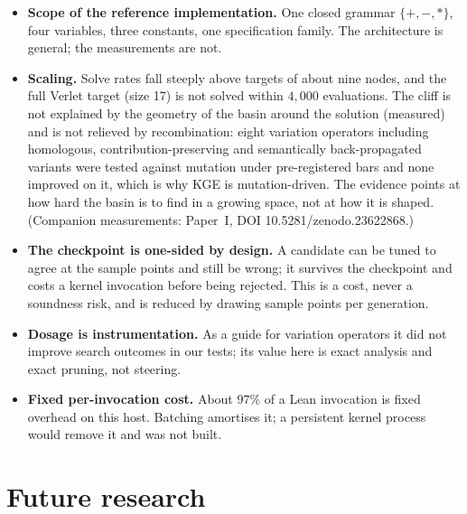 \documentclass[11pt,a4paper]{article}
\theoremstyle{definition}
\theoremstyle{remark}
\begin{document}
\begin{itemize}
\item \textbf{Scope of the reference implementation.} One closed grammar
$\{+,-,*\}$, four variables, three constants, one specification family. The
architecture is general; the measurements are not.
\item \textbf{Scaling.} Solve rates fall steeply above targets of about nine
nodes, and the full Verlet target (size 17) is not solved within $4{,}000$
evaluations. The cliff is not explained by the geometry of the basin around the
solution (measured) and is not relieved by recombination: eight variation
operators including homologous, contribution-preserving and semantically
back-propagated variants were tested against mutation under pre-registered bars
and none improved on it, which is why KGE is mutation-driven. The evidence
points at how hard the basin is to find in a growing space, not at how it is
shaped. (Companion measurements: Paper~I, DOI 10.5281/zenodo.23622868.)
\item \textbf{The checkpoint is one-sided by design.} A candidate can be tuned
to agree at the sample points and still be wrong; it survives the checkpoint and
costs a kernel invocation before being rejected. This is a cost, never a
soundness risk, and is reduced by drawing sample points per generation.
\item \textbf{Dosage is instrumentation.} As a guide for variation operators it
did not improve search outcomes in our tests; its value here is exact analysis
and exact pruning, not steering.
\item \textbf{Fixed per-invocation cost.} About $97\%$ of a Lean invocation is
fixed overhead on this host. Batching amortises it; a persistent kernel process
would remove it and was not built.
\end{itemize}

\section{Future research}
\end{document}
